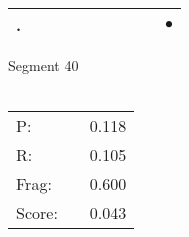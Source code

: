 \documentclass[landscape]{article}
\newcommand{\ssp}{\hspace{2pt}}
\newcommand{\mex}{\cellcolor{g}$\bullet$}
\begin{document}
\begin{tabular}{|l|p{10pt}|p{10pt}|p{10pt}|p{10pt}|p{10pt}|p{10pt}|p{10pt}|p{10pt}|p{10pt}|}
\hline
\ssp \cellcolor{ref8}. \ssp&\hspace{2pt}&\hspace{2pt}&\hspace{2pt}&\hspace{2pt}&\hspace{2pt}&\hspace{2pt}&\hspace{2pt}&\hspace{2pt}&\hspace{2pt}\mex\\
\hline
\end{tabular}

\vspace{6pt}
\noindent Segment 40\\\\
\noindent\begin{tabular}{lm{12pt}r}
\hline
P:&&0.118\\
R:&&0.105\\
Frag:&&0.600\\
Score:&&0.043\\
\end{tabular}

\newpage
\end{document}
